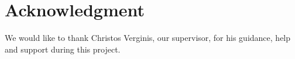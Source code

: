 \documentclass[journal, twoside]{IEEEtran}
\begin{document}
	\section*{Acknowledgment}
	We would like to thank Christos Verginis, our supervisor, for his guidance, help and support during this project.
	
	
	
	
\end{document}
